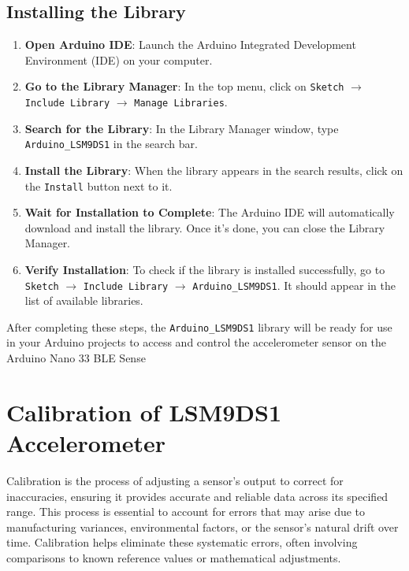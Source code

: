 \subsection*{Installing the Library}

\begin{enumerate}
	\item \textbf{Open Arduino IDE}:  
	Launch the Arduino Integrated Development Environment (IDE) on your computer.
	
	\item \textbf{Go to the Library Manager}:  
	In the top menu, click on \texttt{Sketch} $\rightarrow$ \texttt{Include Library} $\rightarrow$ \texttt{Manage Libraries}.
	
	\item \textbf{Search for the Library}:  
	In the Library Manager window, type \texttt{Arduino\_LSM9DS1} in the search bar.
	
	\item \textbf{Install the Library}:  
	When the library appears in the search results, click on the \texttt{Install} button next to it.
	
	\item \textbf{Wait for Installation to Complete}:  
	The Arduino IDE will automatically download and install the library. Once it's done, you can close the Library Manager.
	
	\item \textbf{Verify Installation}:  
	To check if the library is installed successfully, go to \texttt{Sketch} $\rightarrow$ \texttt{Include Library} $\rightarrow$ \texttt{Arduino\_LSM9DS1}. It should appear in the list of available libraries.
\end{enumerate}

After completing these steps, the \texttt{Arduino\_LSM9DS1} library will be ready for use in your Arduino projects to access and control the accelerometer sensor on the Arduino Nano 33 BLE Sense\cite{Alushi2024}



\section{Calibration of LSM9DS1 Accelerometer}

Calibration is the process of adjusting a sensor’s output to correct for inaccuracies, ensuring it provides accurate and reliable data across its specified range. This process is essential to account for errors that may arise due to manufacturing variances, environmental factors, or the sensor's natural drift over time. Calibration helps eliminate these systematic errors, often involving comparisons to known reference values or mathematical adjustments\cite{Oh:2017}.


